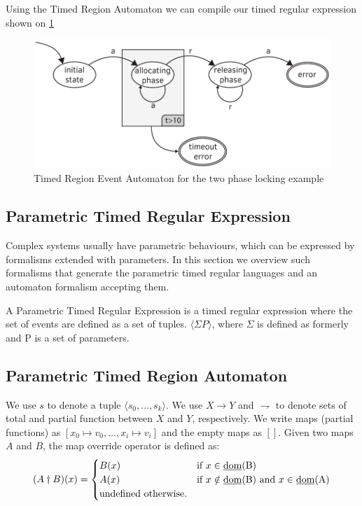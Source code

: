 				Using the Timed Region Automaton we can compile our timed regular expression shown on \cref{fig:cep:trea}
				
				\begin{figure}[h]
				\centering
				\includegraphics[width=0.7\linewidth]{include/figures/chapter_5/illustration_2}
				\caption{Timed Region Event Automaton for the two phase locking example}
				\label{fig:cep:trea}
				\end{figure}


			
		\subsection{Parametric Timed Regular Expression}
			Complex systems usually have parametric behaviours, which can be expressed by formalisms extended with parameters. In this section we overview such formalisms
			that generate the parametric timed regular languages and an automaton formalism accepting them.
			
			\begin{dfn}
			A Parametric Timed Regular Expression is a timed regular expression where the set of events are defined as a set of tuples. $\langle \Sigma P \rangle$,
			where $\Sigma$ is defined as formerly and P is a set of parameters.
			\end{dfn}
		
			\subsection{Parametric Timed Region Automaton}
				
				
				We use $s$ to denote a tuple $\langle s_0,\dots,s_k \rangle$. We use $X \rightarrow Y$ and $\rightharpoondown$ to denote sets of total and partial function between
				$X$ and $Y$, respectively. We write maps (partial functions) as $[x_0 \mapsto v_0,\dots,x_i \mapsto v_i]$ and the empty maps as $[]$. Given two maps $A$ and $B$,
				the map override operator is defined as:
					\[
					 (A \dagger B)(x) = 
					  \begin{cases} 
					   B(x) & \text{if } x \in \text{\underline{dom}(B)} \\
					   A(x) & \text{if } x \notin \text{\underline{dom}(B)} \text{ and } x \in \text{\underline{dom}(A)} \\
					   \text{undefined otherwise.}
					  \end{cases}
					\]
				
